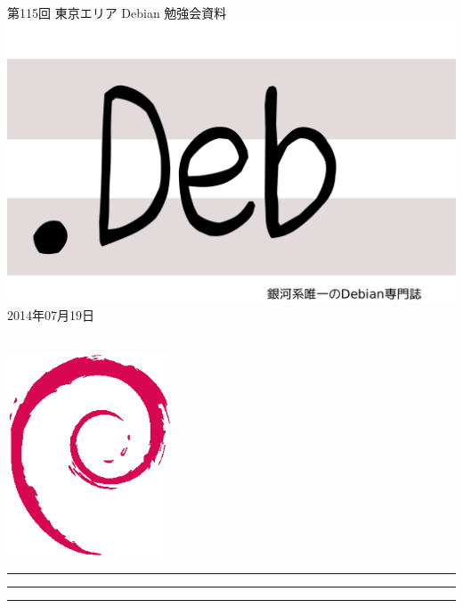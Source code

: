 \documentclass[mingoth,a4paper]{jsarticle}
\newcommand{\debmtgyear}{2014}
\newcommand{\debmtgmonth}{07}
\newcommand{\debmtgdate}{19}
\newcommand{\debmtgnumber}{115}
\begin{document}
\begin{titlepage}
\thispagestyle{empty}

\vspace*{-2cm}
第\debmtgnumber{}回 東京エリア Debian 勉強会資料\\
\hspace*{-2cm}
\includegraphics{image2012-natsu/dotdeb.pdf}\\
\hfill{}\debmtgyear{}年\debmtgmonth{}月\debmtgdate{}日

\\

\vspace*{-2cm}
\hfill{}\includegraphics[height=6cm]{image200502/openlogo-nd.eps}
\end{titlepage}

\newpage

\begin{minipage}[b]{0.2\hsize}
 \colorbox{titleback}{}
\end{minipage}
\begin{minipage}[b]{0.8\hsize}
\hrule
\vspace{2mm}
\hrule
\begin{multicols}{2}
\tableofcontents
\end{multicols}
\vspace{2mm}
\hrule
\end{minipage}
\end{document}

